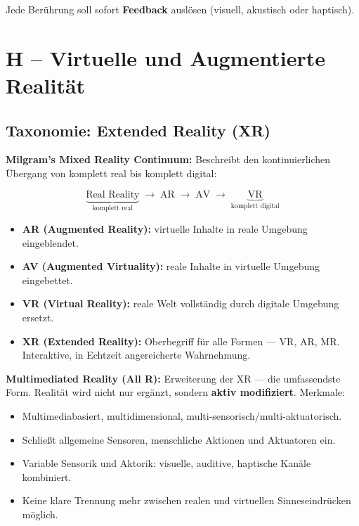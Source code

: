 \documentclass[12pt, a4paper]{article}
\begin{document}
Jede Berührung soll sofort \textbf{Feedback} auslösen (visuell, akustisch oder haptisch).

\section{H -- Virtuelle und Augmentierte Realität}

\subsection{Taxonomie: Extended Reality (XR)}

\textbf{Milgram's Mixed Reality Continuum:} Beschreibt den kontinuierlichen Übergang von komplett real bis komplett digital:

\[
  \underbrace{\text{Real Reality}}_{\text{komplett real}}
  \;\longrightarrow\;
  \text{AR}
  \;\longrightarrow\;
  \text{AV}
  \;\longrightarrow\;
  \underbrace{\text{VR}}_{\text{komplett digital}}
\]

\begin{itemize}
  \item \textbf{AR (Augmented Reality):} virtuelle Inhalte in reale Umgebung eingeblendet.
  \item \textbf{AV (Augmented Virtuality):} reale Inhalte in virtuelle Umgebung eingebettet.
  \item \textbf{VR (Virtual Reality):} reale Welt vollständig durch digitale Umgebung ersetzt.
  \item \textbf{XR (Extended Reality):} Oberbegriff für alle Formen — VR, AR, MR. Interaktive, in Echtzeit angereicherte Wahrnehmung.
\end{itemize}

\textbf{Multimediated Reality (All R):} Erweiterung der XR — die umfassendste Form. Realität wird nicht nur ergänzt, sondern \textbf{aktiv modifiziert}. Merkmale:
\begin{itemize}
  \item Multimediabasiert, multidimensional, multi-sensorisch/multi-aktuatorisch.
  \item Schließt allgemeine Sensoren, menschliche Aktionen und Aktuatoren ein.
  \item Variable Sensorik und Aktorik: visuelle, auditive, haptische Kanäle kombiniert.
  \item Keine klare Trennung mehr zwischen realen und virtuellen Sinneseindrücken möglich.
\end{itemize}
\end{document}
